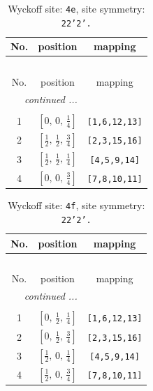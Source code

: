 \documentclass[fleqn,8pt]{jsarticle}
\begin{document}
\renewcommand{\arraystretch}{1.2}
\begin{longtable}{ccc}
\caption{Wyckoff site: {\tt 4e}, site symmetry: {\tt 22'2'.}}
 \\
 \hline \hline
No. & position & mapping \\ \hline \endfirsthead

\multicolumn{2}{l}{\tablename\ \thetable{}} \\
 \hline \hline
No. & position & mapping \\ \hline \endhead

 \hline \hline
\multicolumn{2}{r}{\footnotesize\it continued ...} \\ \endfoot

 \hline \hline
\multicolumn{2}{r}{} \\ \endlastfoot

1 & $\left[ 0,\, 0,\, \frac{1}{4} \right]$ & {\tt [1,6,12,13]} \\ \hline
2 & $\left[ \frac{1}{2},\, \frac{1}{2},\, \frac{3}{4} \right]$ & {\tt [2,3,15,16]} \\ \hline
3 & $\left[ \frac{1}{2},\, \frac{1}{2},\, \frac{1}{4} \right]$ & {\tt [4,5,9,14]} \\ \hline
4 & $\left[ 0,\, 0,\, \frac{3}{4} \right]$ & {\tt [7,8,10,11]} \\
\end{longtable}
\renewcommand{\arraystretch}{1.2}
\begin{longtable}{ccc}
\caption{Wyckoff site: {\tt 4f}, site symmetry: {\tt 22'2'.}}
 \\
 \hline \hline
No. & position & mapping \\ \hline \endfirsthead

\multicolumn{2}{l}{\tablename\ \thetable{}} \\
 \hline \hline
No. & position & mapping \\ \hline \endhead

 \hline \hline
\multicolumn{2}{r}{\footnotesize\it continued ...} \\ \endfoot

 \hline \hline
\multicolumn{2}{r}{} \\ \endlastfoot

1 & $\left[ 0,\, \frac{1}{2},\, \frac{1}{4} \right]$ & {\tt [1,6,12,13]} \\ \hline
2 & $\left[ 0,\, \frac{1}{2},\, \frac{3}{4} \right]$ & {\tt [2,3,15,16]} \\ \hline
3 & $\left[ \frac{1}{2},\, 0,\, \frac{1}{4} \right]$ & {\tt [4,5,9,14]} \\ \hline
4 & $\left[ \frac{1}{2},\, 0,\, \frac{3}{4} \right]$ & {\tt [7,8,10,11]} \\
\end{longtable}
\end{document}
